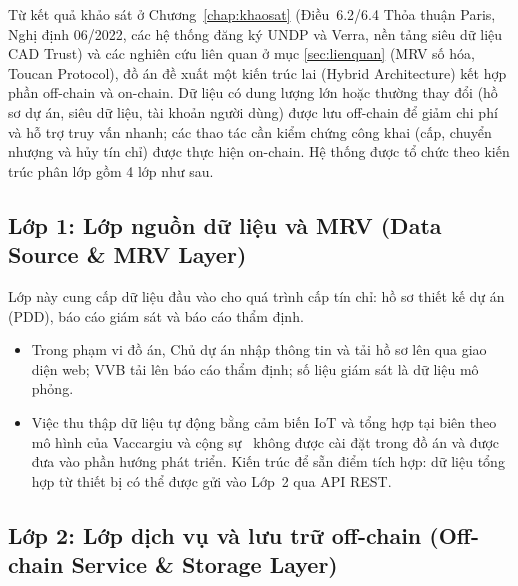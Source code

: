 Từ kết quả khảo sát ở Chương~\ref{chap:khaosat} (Điều~6.2/6.4 Thỏa thuận Paris, Nghị định 06/2022, các hệ thống đăng ký UNDP và Verra, nền tảng siêu dữ liệu CAD Trust) và các nghiên cứu liên quan ở mục \ref{sec:lienquan} (MRV số hóa, Toucan Protocol), đồ án đề xuất một kiến trúc lai (Hybrid Architecture) kết hợp phần off-chain và on-chain. Dữ liệu có dung lượng lớn hoặc thường thay đổi (hồ sơ dự án, siêu dữ liệu, tài khoản người dùng) được lưu off-chain để giảm chi phí và hỗ trợ truy vấn nhanh; các thao tác cần kiểm chứng công khai (cấp, chuyển nhượng và hủy tín chỉ) được thực hiện on-chain. Hệ thống được tổ chức theo kiến trúc phân lớp gồm 4 lớp như sau.

\subsection*{Lớp 1: Lớp nguồn dữ liệu và MRV (Data Source \& MRV Layer)}
\label{subsec:lop1}

Lớp này cung cấp dữ liệu đầu vào cho quá trình cấp tín chỉ: hồ sơ thiết kế dự án (PDD), báo cáo giám sát và báo cáo thẩm định.
\begin{itemize}
    \item Trong phạm vi đồ án, Chủ dự án nhập thông tin và tải hồ sơ lên qua giao diện web; VVB tải lên báo cáo thẩm định; số liệu giám sát là dữ liệu mô phỏng.
    \item Việc thu thập dữ liệu tự động bằng cảm biến IoT và tổng hợp tại biên theo mô hình của Vaccargiu và cộng sự~\cite{vaccargiu2026blockchain} không được cài đặt trong đồ án và được đưa vào phần hướng phát triển. Kiến trúc để sẵn điểm tích hợp: dữ liệu tổng hợp từ thiết bị có thể được gửi vào Lớp~2 qua API REST.
\end{itemize}

\subsection*{Lớp 2: Lớp dịch vụ và lưu trữ off-chain (Off-chain Service \& Storage Layer)}
\label{subsec:lop2}

